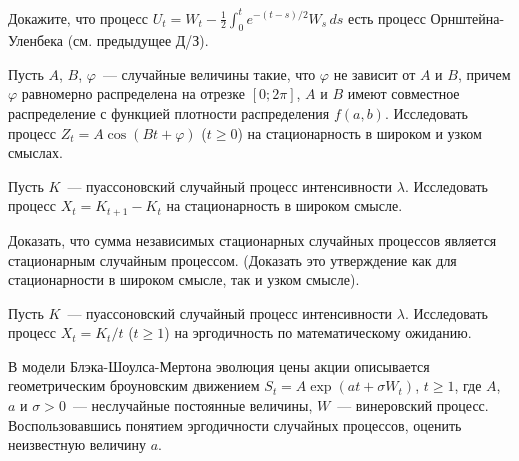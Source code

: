 \documentclass[12pt]{article}
\def\canon{\textbf{(каноническое задание)}}
\begin{document}
\begin{exercise}
    Докажите, что процесс $ \displaystyle U_t = W_t - \frac{1}{2} \int_0^t e^{-(t - s)/2} W_s \, ds $
    есть процесс Орнштейна-Уленбека (см. предыдущее Д/З).
\end{exercise}

\newpage




\begin{exercise}[subtitle={\canon}]
    Пусть $ A $, $ B $, $ \varphi $~--- случайные величины такие,
    что $ \varphi $ не зависит от $ A $ и $ B $,
    причем $ \varphi $ равномерно распределена на отрезке $ [0; 2\pi] $,
    $ A $ и $ B $ имеют совместное распределение с функцией плотности распределения $ f(a, b) $.
    Исследовать процесс $ Z_t = A \cos(B t + \varphi) $ ($ t \geqslant 0 $) на стационарность в широком и узком смыслах.
\end{exercise}


\begin{exercise}[subtitle={\canon}]
    Пусть $ K $~--- пуассоновский случайный процесс интенсивности $ \lambda $.
    Исследовать процесс $ X_t = K_{t+1} - K_t $ на стационарность в широком смысле.
\end{exercise}


\begin{exercise}[subtitle={\canon}]
    Доказать, что сумма независимых стационарных случайных процессов является стационарным случайным процессом.
    (Доказать это утверждение как для стационарности в широком смысле, так и узком смысле).
\end{exercise}


\begin{exercise}[subtitle={\canon}]
    Пусть $ K $~--- пуассоновский случайный процесс интенсивности $ \lambda $.
    Исследовать процесс $ X_t = K_t / t $ ($ t \geqslant 1 $) на эргодичность по математическому ожиданию.
\end{exercise}


\begin{exercise}[subtitle={\canon}]
    В модели Блэка-Шоулса-Мертона эволюция цены акции описывается геометрическим броуновским движением
    $ S_t = A \exp(a t + \sigma W_t) $, $ t \geqslant 1 $,
    где $ A $, $ a $ и $ \sigma > 0 $~--- неслучайные постоянные величины,
    $ W $~--- винеровский процесс.
    Воспользовавшись понятием эргодичности случайных процессов, оценить неизвестную величину $ a $.
\end{exercise}
\end{document}
